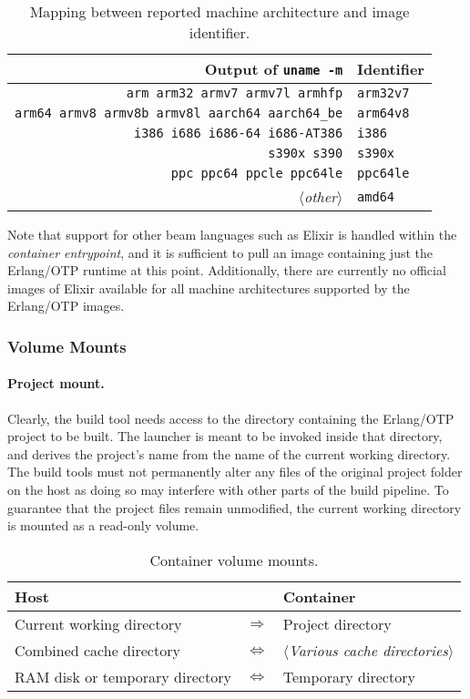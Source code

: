 \begin{table}
  \setlength{\tabcolsep}{10pt}
  \centering
  \begin{tabular}{ r l }
    Output of \lstinline|uname -m| & Identifier \\
    \hline
    \lstinline|arm arm32 armv7 armv7l armhfp| & \lstinline|arm32v7| \\
    \lstinline|arm64 armv8 armv8b armv8l aarch64 aarch64_be| & \lstinline|arm64v8| \\
    \lstinline|i386 i686 i686-64 i686-AT386| & \lstinline|i386| \\
    \lstinline|s390x s390| & \lstinline|s390x| \\
    \lstinline|ppc ppc64 ppcle ppc64le| & \lstinline|ppc64le| \\
    $\langle$\emph{other}$\rangle$ & \lstinline|amd64| \\
  \end{tabular}
  \caption{Mapping between reported machine architecture and image identifier.}\label{table:architectures}
\end{table}

Note that support for other \acrshort{beam} languages such as Elixir is handled within the \emph{container entrypoint}, and it is sufficient to pull an image containing just the Erlang/OTP runtime at this point. Additionally, there are currently no official images of Elixir available for all machine architectures supported by the Erlang/OTP images.

\subsubsection{Volume Mounts}

\paragraph{Project mount.} Clearly, the build tool needs access to the directory containing the Erlang/OTP project to be built. The launcher is meant to be invoked inside that directory, and derives the project's name from the name of the current working directory. The build tools must not permanently alter any files of the original project folder on the host as doing so may interfere with other parts of the build pipeline. To guarantee that the project files remain unmodified, the current working directory is mounted as a read-only volume.

\begin{table}[h]
  \setlength{\tabcolsep}{10pt}
  \centering
  \begin{tabular}{ l c l }
    Host & & Container \\
    \hline
    Current working directory &
      $\Longrightarrow$ &
      Project directory \\
    Combined cache directory &
      $\Longleftrightarrow$ &
      $\langle$\emph{Various cache directories}$\rangle$ \\
    RAM disk or temporary directory &
      $\Longleftrightarrow$ &
      Temporary directory \\
  \end{tabular}
  \caption{Container volume mounts.}
\end{table}

